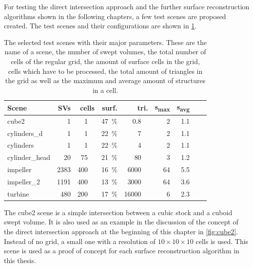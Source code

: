 For testing the direct intersection approach and the further surface reconstruction algorithms shown in the following chapters, a few test scenes are proposed created.
The test scenes and their configurations are shown in \cref{tbl:test_scenes}.
%
\begin{table}[h]
	\centering
	\begin{tabular}{lrrrrrrrr}
		Scene          & SVs  & cells & surf. & tri.  & s\textsubscript{max} & s\textsubscript{avg} \\
		\midrule
		cube2          &    1 & \SI{  1}{\kilo\nothing} & \SI{47}{\percent} & \SI{  0.8}{\kilo\nothing} &  2 & 1.1 \\
		cylinders\_d   &    1 & \SI{  1}{\kilo\nothing} & \SI{22}{\percent} & \SI{    7}{\kilo\nothing} &  2 & 1.1 \\
		cylinders      &    1 & \SI{  1}{\kilo\nothing} & \SI{22}{\percent} & \SI{    4}{\kilo\nothing} &  2 & 1.1 \\
		cylinder\_head &   20 & \SI{ 75}{\kilo\nothing} & \SI{21}{\percent} & \SI{   80}{\kilo\nothing} &  3 & 1.2 \\
		impeller       & 2383 & \SI{400}{\kilo\nothing} & \SI{16}{\percent} & \SI{ 6000}{\kilo\nothing} & 64 & 5.5 \\
		impeller\_2    & 1191 & \SI{400}{\kilo\nothing} & \SI{13}{\percent} & \SI{ 3000}{\kilo\nothing} & 64 & 3.6 \\
		turbine        &  480 & \SI{200}{\kilo\nothing} & \SI{17}{\percent} & \SI{16000}{\kilo\nothing} &  6 & 2.3 \\
	\end{tabular}
	\caption{
		The selected test scenes with their major parameters.
		These are the name of a scene, the number of swept volumes, the total number of cells of the regular grid, the amount of surface cells in the grid, \ie cells which have to be processed, the total amount of triangles in the grid as well as the maximum and average amount of structures in a cell.
	}
	\label{tbl:test_scenes}
\end{table}

The cube2 scene is a simple intersection between a cubic stock and a cuboid swept volume.
It is also used as an example in the discussion of the concept of the direct intersection approach at the beginning of this chapter in \cref{fig:cube2}.
Instead of no grid, a small one with a resolution of $10\times10\times10$ cells is used.
This scene is used as a proof of concept for each surface reconstruction algorithm in this thesis.


